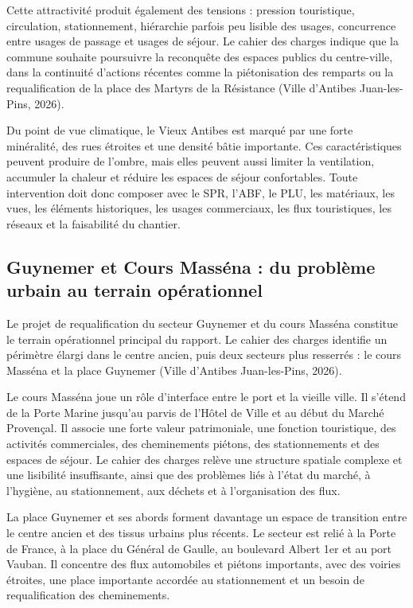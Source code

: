 \documentclass[11pt,a4paper]{report}
\begin{document}
Cette attractivité produit également des tensions : pression touristique, circulation, stationnement, hiérarchie parfois peu lisible des usages, concurrence entre usages de passage et usages de séjour. Le cahier des charges indique que la commune souhaite poursuivre la reconquête des espaces publics du centre-ville, dans la continuité d'actions récentes comme la piétonisation des remparts ou la requalification de la place des Martyrs de la Résistance (Ville d'Antibes Juan-les-Pins, 2026).

Du point de vue climatique, le Vieux Antibes est marqué par une forte minéralité, des rues étroites et une densité bâtie importante. Ces caractéristiques peuvent produire de l'ombre, mais elles peuvent aussi limiter la ventilation, accumuler la chaleur et réduire les espaces de séjour confortables. Toute intervention doit donc composer avec le SPR, l'ABF, le PLU, les matériaux, les vues, les éléments historiques, les usages commerciaux, les flux touristiques, les réseaux et la faisabilité du chantier.

\subsection{Guynemer et Cours Masséna : du problème urbain au terrain opérationnel}

Le projet de requalification du secteur Guynemer et du cours Masséna constitue le terrain opérationnel principal du rapport. Le cahier des charges identifie un périmètre élargi dans le centre ancien, puis deux secteurs plus resserrés : le cours Masséna et la place Guynemer (Ville d'Antibes Juan-les-Pins, 2026).

Le cours Masséna joue un rôle d'interface entre le port et la vieille ville. Il s'étend de la Porte Marine jusqu'au parvis de l'Hôtel de Ville et au début du Marché Provençal. Il associe une forte valeur patrimoniale, une fonction touristique, des activités commerciales, des cheminements piétons, des stationnements et des espaces de séjour. Le cahier des charges relève une structure spatiale complexe et une lisibilité insuffisante, ainsi que des problèmes liés à l'état du marché, à l'hygiène, au stationnement, aux déchets et à l'organisation des flux.

La place Guynemer et ses abords forment davantage un espace de transition entre le centre ancien et des tissus urbains plus récents. Le secteur est relié à la Porte de France, à la place du Général de Gaulle, au boulevard Albert 1er et au port Vauban. Il concentre des flux automobiles et piétons importants, avec des voiries étroites, une place importante accordée au stationnement et un besoin de requalification des cheminements.
\end{document}
